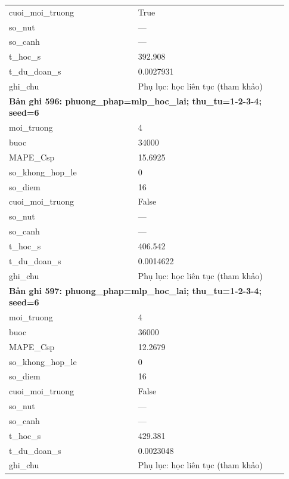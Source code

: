 \begin{longtable}{p{0.43\linewidth}p{0.50\linewidth}}
cuoi\_\allowbreak moi\_\allowbreak truong & True \\
so\_\allowbreak nut & — \\
so\_\allowbreak canh & — \\
t\_\allowbreak hoc\_\allowbreak s & 392.908 \\
t\_\allowbreak du\_\allowbreak doan\_\allowbreak s & 0.0027931 \\
ghi\_\allowbreak chu & Phụ lục: học liên tục (tham khảo) \\
\midrule
\multicolumn{2}{p{0.95\linewidth}}{\textbf{Bản ghi 596: phuong\_phap=mlp\_hoc\_lai; thu\_tu=1-2-3-4; seed=6}} \\
moi\_\allowbreak truong & 4 \\
buoc & 34000 \\
MAPE\_\allowbreak Csp & 15.6925 \\
so\_\allowbreak khong\_\allowbreak hop\_\allowbreak le & 0 \\
so\_\allowbreak diem & 16 \\
cuoi\_\allowbreak moi\_\allowbreak truong & False \\
so\_\allowbreak nut & — \\
so\_\allowbreak canh & — \\
t\_\allowbreak hoc\_\allowbreak s & 406.542 \\
t\_\allowbreak du\_\allowbreak doan\_\allowbreak s & 0.0014622 \\
ghi\_\allowbreak chu & Phụ lục: học liên tục (tham khảo) \\
\midrule
\multicolumn{2}{p{0.95\linewidth}}{\textbf{Bản ghi 597: phuong\_phap=mlp\_hoc\_lai; thu\_tu=1-2-3-4; seed=6}} \\
moi\_\allowbreak truong & 4 \\
buoc & 36000 \\
MAPE\_\allowbreak Csp & 12.2679 \\
so\_\allowbreak khong\_\allowbreak hop\_\allowbreak le & 0 \\
so\_\allowbreak diem & 16 \\
cuoi\_\allowbreak moi\_\allowbreak truong & False \\
so\_\allowbreak nut & — \\
so\_\allowbreak canh & — \\
t\_\allowbreak hoc\_\allowbreak s & 429.381 \\
t\_\allowbreak du\_\allowbreak doan\_\allowbreak s & 0.0023048 \\
ghi\_\allowbreak chu & Phụ lục: học liên tục (tham khảo) \\

\end{longtable}

